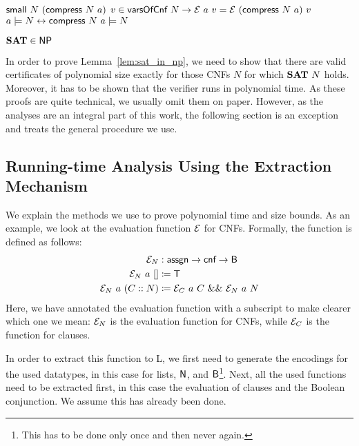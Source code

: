 \begin{lemma}\leavevmode
  \begin{enumerate}
     $\textsf{small}~N~(\textsf{compress}~N~a)$
     $v \in \textsf{varsOfCnf}~N \rightarrow \mathcal{E}~a~v = \mathcal{E}~(\textsf{compress}~N~a)~v$
     $a \models N \leftrightarrow \textsf{compress}~N~a \models N$
  \end{enumerate}
\end{lemma}

\begin{lemma}[\SAT{} is in \NP{}][sat_NP]\label{lem:sat_in_np}
  $\textbf{SAT}{} \in \normalfont{\textsf{NP}{}}$
\end{lemma}

In order to prove Lemma~\ref{lem:sat_in_np}, we need to show that there are valid certificates of polynomial size exactly for those CNFs $N$ for which $\textbf{SAT}{}~N$ holds. 
Moreover, it has to be shown that the verifier runs in polynomial time. 
As these proofs are quite technical, we usually omit them on paper. However, as the analyses are an integral part of this work, the following section is an exception and treats the general procedure we use.

\subsection{Running-time Analysis Using the Extraction Mechanism}
  We explain the methods we use to prove polynomial time and size bounds. 
  As an example, we look at the evaluation function $\mathcal{E}$ for CNFs. 
  Formally, the function is defined as follows:
  \begin{align*}
    \mathcal{E}_N &: \textsf{assgn} \rightarrow \textsf{cnf} \rightarrow \textsf{B} \\
    \mathcal{E}_N~a~[] &\coloneqq \mathsf{T} \\
    \mathcal{E}_N~a~(C::N) &\coloneqq \mathcal{E}_C~a~C~\&\&~\mathcal{E}_N~a~N
  \end{align*}
  Here, we have annotated the evaluation function with a subscript to make clearer which one we mean: $\mathcal{E}_N$ is the evaluation function for CNFs, while $\mathcal{E}_C$ is the function for clauses.

  In order to extract this function to L, we first need to generate the encodings for the used datatypes, in this case for lists, $\mathsf{N}$, and $\textsf{B}$\footnote{This has to be done only once and then never again.}. 
  Next, all the used functions need to be extracted first, in this case the evaluation of clauses and the Boolean conjunction. We assume this has already been done. 

